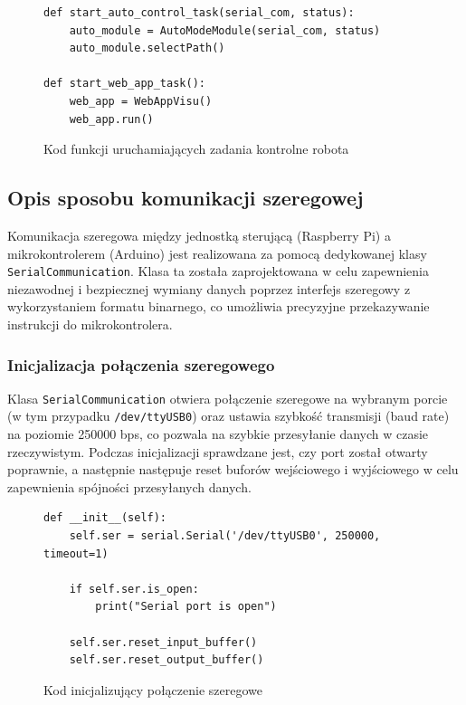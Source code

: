 \begin{figure}[H]
  \centering
  \begin{lstlisting}
def start_auto_control_task(serial_com, status):
    auto_module = AutoModeModule(serial_com, status)
    auto_module.selectPath()

def start_web_app_task():
    web_app = WebAppVisu()
    web_app.run()
  \end{lstlisting}
  \caption{Kod funkcji uruchamiających zadania kontrolne robota}
  \label{fig:tasks_start}
\end{figure}

\subsection{Opis sposobu komunikacji szeregowej}

Komunikacja szeregowa między jednostką sterującą (Raspberry Pi) a mikrokontrolerem (Arduino) jest realizowana za pomocą dedykowanej klasy \texttt{SerialCommunication}. Klasa ta została zaprojektowana w celu zapewnienia niezawodnej i bezpiecznej wymiany danych poprzez interfejs szeregowy z wykorzystaniem formatu binarnego, co umożliwia precyzyjne przekazywanie instrukcji do mikrokontrolera.

\subsubsection{Inicjalizacja połączenia szeregowego}

Klasa \texttt{SerialCommunication} otwiera połączenie szeregowe na wybranym porcie (w tym przypadku \texttt{/dev/ttyUSB0}) oraz ustawia szybkość transmisji (baud rate) na poziomie 250000 bps, co pozwala na szybkie przesyłanie danych w czasie rzeczywistym. Podczas inicjalizacji sprawdzane jest, czy port został otwarty poprawnie, a następnie następuje reset buforów wejściowego i wyjściowego w celu zapewnienia spójności przesyłanych danych.

\begin{figure}[H]
  \centering
  \begin{lstlisting}
def __init__(self):
    self.ser = serial.Serial('/dev/ttyUSB0', 250000, timeout=1)

    if self.ser.is_open:
        print("Serial port is open")

    self.ser.reset_input_buffer()
    self.ser.reset_output_buffer()
  \end{lstlisting}
  \caption{Kod inicjalizujący połączenie szeregowe}
  \label{fig:serial_init}
\end{figure}

